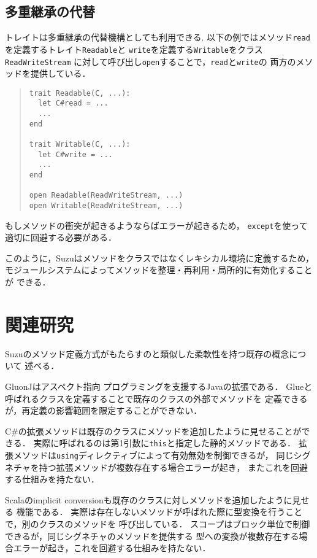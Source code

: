 \documentclass[a4paper,11pt,dvipdfmx]{jreport}
\begin{document}
\section{多重継承の代替}

トレイトは多重継承の代替機構としても利用できる.
以下の例ではメソッド\verb|read|を定義するトレイト\verb|Readable|と
\verb|write|を定義する\verb|Writable|をクラス\verb|ReadWriteStream|
に対して呼び出し\verb|open|することで，\verb|read|と\verb|write|の
両方のメソッドを提供している．
\begin{quote}
\begin{verbatim}
trait Readable(C, ...):
  let C#read = ...
  ...
end

trait Writable(C, ...):
  let C#write = ...
  ...
end

open Readable(ReadWriteStream, ...)
open Writable(ReadWriteStream, ...)
\end{verbatim}
\end{quote}
もしメソッドの衝突が起きるようならばエラーが起きるため，
\verb|except|を使って適切に回避する必要がある．

このように，Suzuはメソッドをクラスではなくレキシカル環境に定義するため，
モジュールシステムによってメソッドを整理・再利用・局所的に有効化することが
できる．


\chapter{関連研究}
\label{chapter:related-work}

Suzuのメソッド定義方式がもたらすのと類似した柔軟性を持つ既存の概念について
述べる．

GluonJ\cite{Chiba:2010:MMC:1869459.1869503}はアスペクト指向
プログラミングを支援するJavaの拡張である．
Glueと呼ばれるクラスを定義することで既存のクラスの外部でメソッドを
定義できるが，再定義の影響範囲を限定することができない．

C\#の拡張メソッドは既存のクラスにメソッドを追加したように見せることができる．
実際に呼ばれるのは第1引数に\verb|this|と指定した静的メソッドである．
拡張メソッドは\verb|using|ディレクティブによって有効無効を制御できるが，
同じシグネチャを持つ拡張メソッドが複数存在する場合エラーが起き，
またこれを回避する仕組みを持たない．

Scalaのimplicit conversionも既存のクラスに対しメソッドを追加したように見せる
機能である．
実際は存在しないメソッドが呼ばれた際に型変換を行うことで，別のクラスのメソッドを
呼び出している．
スコープはブロック単位で制御できるが，同じシグネチャのメソッドを提供する
型への変換が複数存在する場合エラーが起き，これを回避する仕組みを持たない．
\end{document}
